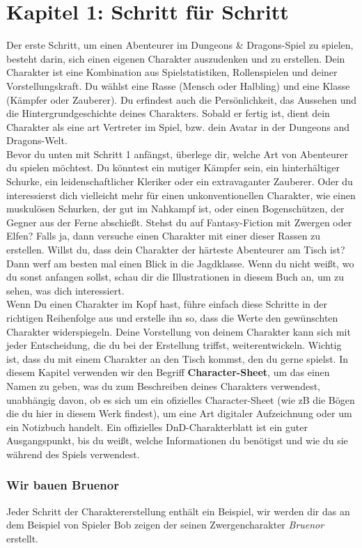 \section{Kapitel 1: Schritt für Schritt}
Der erste Schritt, um einen Abenteurer im Dungeons & Dragons-Spiel zu spielen, besteht darin, sich einen eigenen Charakter auszudenken und zu erstellen. Dein Charakter ist eine Kombination aus Spielstatistiken, Rollenspielen und deiner Vorstellungskraft. Du wählst eine Rasse (Mensch oder Halbling) und eine Klasse (Kämpfer oder Zauberer). Du erfindest auch die Persönlichkeit, das Aussehen und die Hintergrundgeschichte deines Charakters. Sobald er fertig ist, dient dein Charakter als eine art Vertreter im Spiel, bzw. dein Avatar in der Dungeons and Dragons-Welt.\\
Bevor du unten mit Schritt 1 anfängst, überlege dir, welche Art von Abenteurer du spielen möchtest. Du könntest ein mutiger Kämpfer sein, ein hinterhältiger Schurke, ein leidenschaftlicher Kleriker oder ein extravaganter Zauberer. Oder du interessierst dich vielleicht mehr für einen unkonventionellen Charakter, wie einen muskulösen Schurken, der gut im Nahkampf ist, oder einen Bogenschützen, der Gegner aus der Ferne abschießt. Stehst du auf Fantasy-Fiction mit Zwergen oder Elfen? Falls ja, dann versuche einen Charakter mit einer dieser Rassen zu erstellen. Willst du, dass dein Charakter der härteste Abenteurer am Tisch ist? Dann werf am besten mal einen Blick in die Jagdklasse. Wenn du nicht weißt, wo du sonst anfangen sollst, schau dir die Illustrationen in diesem Buch an, um zu sehen, was dich interessiert.\\
Wenn Du einen Charakter im Kopf hast, führe einfach diese Schritte in der richtigen Reihenfolge aus und erstelle ihn so, dass die Werte den gewünschten Charakter widerspiegeln. Deine Vorstellung von deinem Charakter kann sich mit jeder Entscheidung, die du bei der Erstellung triffst, weiterentwickeln. Wichtig ist, dass du mit einem Charakter an den Tisch kommst, den du gerne spielst. In diesem Kapitel verwenden wir den Begriff \textbf{Character-Sheet}, um das einen Namen zu geben, was du zum Beschreiben deines Charakters verwendest, unabhängig davon, ob es sich um ein ofizielles Character-Sheet (wie zB die Bögen die du hier in diesem Werk findest), um eine Art digitaler Aufzeichnung oder um ein Notizbuch handelt. Ein offizielles DnD-Charakterblatt ist ein guter Ausgangspunkt, bis du weißt, welche Informationen du benötigst und wie du sie während des Spiels verwendest.
\subsubsection{Wir bauen Bruenor}
Jeder Schritt der Charaktererstellung enthält ein Beispiel, wir werden dir das an dem Beispiel von Spieler Bob zeigen der seinen Zwergencharakter \textit{Bruenor} erstellt.



